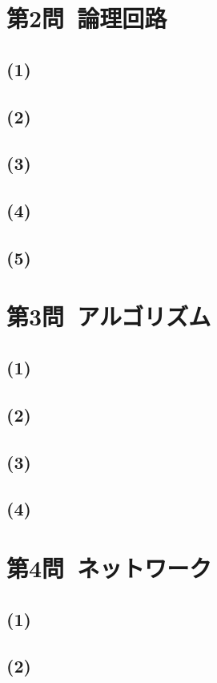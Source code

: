 \documentclass[a4paper,12pt,xelatex,ja=standard]{bxjsarticle}
\begin{document}
\section*{第2問\ 論理回路}
  \subsection*{(1)}
  \subsection*{(2)}
  \subsection*{(3)}
  \subsection*{(4)}
  \subsection*{(5)}

\section*{第3問\ アルゴリズム}
  \subsection*{(1)}
  \subsection*{(2)}
  \subsection*{(3)}
  \subsection*{(4)}

\section*{第4問\ ネットワーク}
  \subsection*{(1)}
  \subsection*{(2)}
\end{document}
